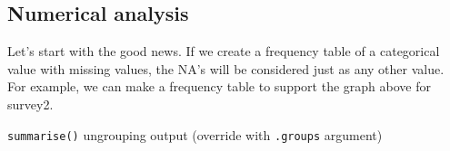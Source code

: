 \documentclass[]{tufte-book}
\newenvironment{Shaded}{}{}
\newcommand{\DataTypeTok}[1]{\textcolor[rgb]{0.56,0.13,0.00}{#1}}
\newcommand{\KeywordTok}[1]{\textcolor[rgb]{0.00,0.44,0.13}{\textbf{#1}}}
\newcommand{\NormalTok}[1]{#1}
\newcommand{\OperatorTok}[1]{\textcolor[rgb]{0.40,0.40,0.40}{#1}}
\newcommand{\StringTok}[1]{\textcolor[rgb]{0.25,0.44,0.63}{#1}}
\begin{document}
\hypertarget{numerical-analysis}{%
\subsection{Numerical analysis}\label{numerical-analysis}}

Let's start with the good news. If we create a frequency table of a categorical value with missing values, the NA's will be considered just as any other value. For example, we can make a frequency table to support the graph above for survey2.

\begin{Shaded}
\end{Shaded}

\texttt{summarise()} ungrouping output (override with \texttt{.groups} argument)
\end{document}
